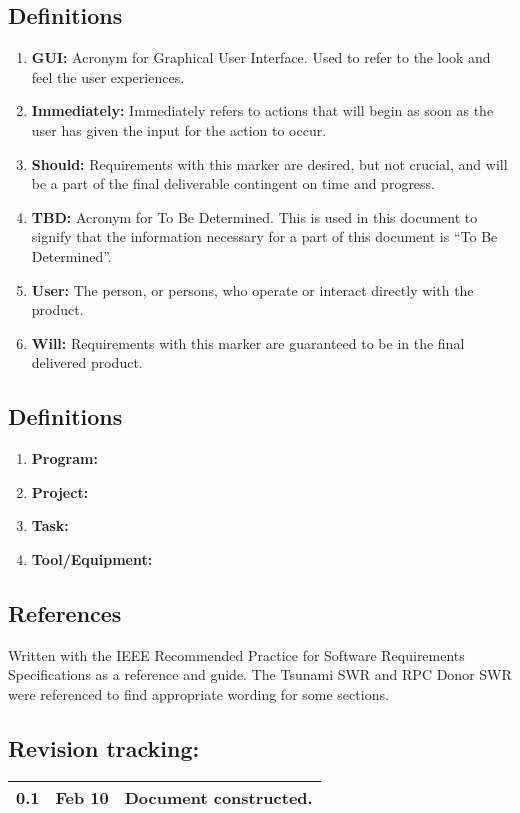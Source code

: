 \documentclass[12pt]{article}
\begin{document}
\subsection{Definitions}
\begin{enumerate}
\item \textbf{GUI:} Acronym for Graphical User Interface. Used to refer to the look and feel the user experiences.
\item \textbf{Immediately:} Immediately refers to actions that will begin as soon as the user has given the input for the action to occur.
\item \textbf{Should:} Requirements with this marker are desired, but not crucial, and will be a part of the final deliverable contingent on time and progress.
\item \textbf{TBD:} Acronym for To Be Determined. This is used in this document to signify that the information necessary for a part of this document is ``To Be Determined''.
\item \textbf{User:} The person, or persons, who operate or interact directly with the product.
\item \textbf{Will:} Requirements with this marker are guaranteed to be in the final delivered product.
\end{enumerate}

\subsection{Definitions}
\begin{enumerate}
\item \textbf{Program:}  
\item \textbf{Project:}  
\item \textbf{Task:}  
\item \textbf{Tool/Equipment:}  
\end{enumerate}

\subsection{References}
Written with the IEEE Recommended Practice for Software Requirements Specifications as a reference and guide. The Tsunami SWR and RPC Donor SWR were referenced to find appropriate wording for some sections.

\subsection{Revision tracking:}
\begin{tabular}{|l|r|p{5in}|}
\hline
0.1 & Feb 10 & Document constructed.\\
\hline
\end{tabular}
\end{document}
